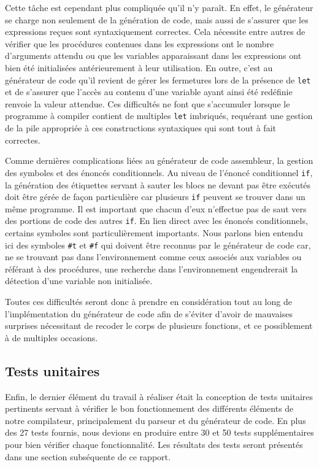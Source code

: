 \documentclass[12pt]{article}
\begin{document}
Cette tâche est cependant plus compliquée qu'il n'y paraît. En effet, le générateur se charge non seulement de la génération de code, mais aussi de s'assurer que les expressions reçues sont syntaxiquement correctes. Cela nécessite entre autres de vérifier que les procédures contenues dans les expressions ont le nombre d'arguments attendu ou que les variables apparaissant dans les expressions ont bien été initialisées antérieurement à leur utilisation. En outre, c'est au générateur de code qu'il revient de gérer les fermetures lors de la présence de \texttt{let} et de s'assurer que l'accès au contenu d'une variable ayant ainsi été redéfinie renvoie la valeur attendue. Ces difficultés ne font que s'accumuler lorsque le programme à compiler contient de multiples \texttt{let} imbriqués, requérant une gestion de la pile appropriée à ces constructions syntaxiques qui sont tout à fait correctes.

Comme dernières complications liées au générateur de code assembleur, la gestion des symboles et des énoncés conditionnels. Au niveau de l'énoncé conditionnel \texttt{if}, la génération des étiquettes servant à sauter les blocs ne devant pas être exécutés doit être gérée de façon particulière car plusieurs \texttt{if} peuvent se trouver dans un même programme. Il est important que chacun d'eux n'effectue pas de saut vers des portions de code des autres \texttt{if}. En lien direct avec les énoncés conditionnels, certains symboles sont particulièrement importants. Nous parlons bien entendu ici des symboles \texttt{\#t} et \texttt{\#f} qui doivent être reconnus par le générateur de code car, ne se trouvant pas dans l'environnement comme ceux associés aux variables ou référant à des procédures, une recherche dans l'environnement engendrerait la détection d'une variable non initialisée.

Toutes ces difficultés seront donc à prendre en considération tout au long de l'implémentation du générateur de code afin de s'éviter d'avoir de mauvaises surprises nécessitant de recoder le corps de plusieurs fonctions, et ce possiblement à de multiples occasions.

\subsection{Tests unitaires}
Enfin, le dernier élément du travail à réaliser était la conception de tests unitaires pertinents servant à vérifier le bon fonctionnement des différents éléments de notre compilateur, principalement du parseur et du générateur de code. En plus des 27 tests fournis, nous devions en produire entre 30 et 50 tests supplémentaires pour bien vérifier chaque fonctionnalité. Les résultats des tests seront présentés dans une section subséquente de ce rapport.
\end{document}
